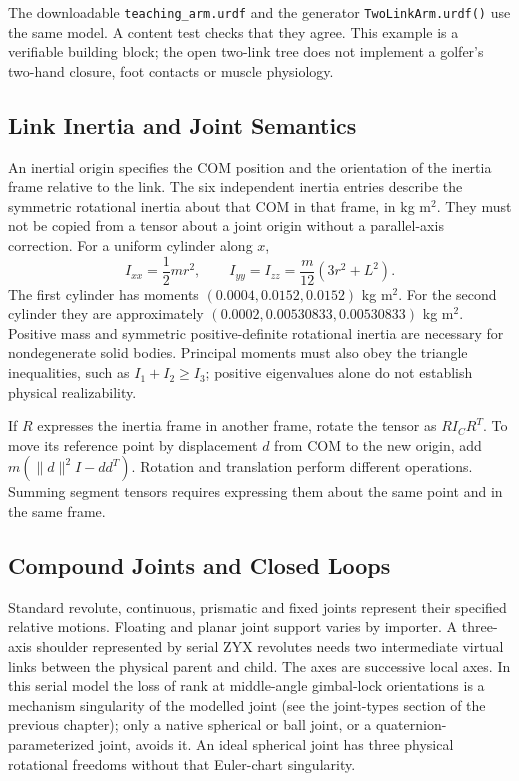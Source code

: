 The downloadable \texttt{teaching\_arm.urdf} and the generator \texttt{TwoLinkArm.urdf()} use the same model. A content test checks that they agree. This example is a verifiable building block; the open two-link tree does not implement a golfer's two-hand closure, foot contacts or muscle physiology.

\subsection{Link Inertia and Joint Semantics}
\label{def:urdf_link}
\label{def:urdf_joint}

An inertial origin specifies the COM position and the orientation of the inertia frame relative to the link. The six independent inertia entries describe the symmetric rotational inertia about that COM in that frame, in kg m$^2$. They must not be copied from a tensor about a joint origin without a parallel-axis correction. For a uniform cylinder along $x$,
\begin{equation}
I_{xx}=\frac12 mr^2,\qquad I_{yy}=I_{zz}=\frac{m}{12}(3r^2+L^2).
\end{equation}
The first cylinder has moments $(0.0004,0.0152,0.0152)$ kg m$^2$. For the second cylinder they are approximately $(0.0002,0.00530833,0.00530833)$ kg m$^2$. Positive mass and symmetric positive-definite rotational inertia are necessary for nondegenerate solid bodies. Principal moments must also obey the triangle inequalities, such as $I_1+I_2\geq I_3$; positive eigenvalues alone do not establish physical realizability.

If $R$ expresses the inertia frame in another frame, rotate the tensor as $R I_C R^T$. To move its reference point by displacement $d$ from COM to the new origin, add $m(\|d\|^2I-dd^T)$. Rotation and translation perform different operations. Summing segment tensors requires expressing them about the same point and in the same frame.

\subsection{Compound Joints and Closed Loops}

Standard revolute, continuous, prismatic and fixed joints represent their specified relative motions. Floating and planar joint support varies by importer. A three-axis shoulder represented by serial ZYX revolutes needs two intermediate virtual links between the physical parent and child. The axes are successive local axes. In this serial model the loss of rank at middle-angle gimbal-lock orientations is a mechanism singularity of the modelled joint (see the joint-types section of the previous chapter); only a native spherical or ball joint, or a quaternion-parameterized joint, avoids it. An ideal spherical joint has three physical rotational freedoms without that Euler-chart singularity.


